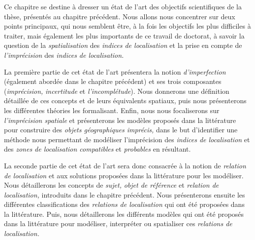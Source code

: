Ce chapitre se destine à dresser un état de l'art des objectifs
scientifiques de la thèse, présentés au chapitre précédent. Nous
allons nous concentrer sur deux points principaux, qui nous semblent
être, à la fois les objectifs les plus difficiles à traiter, mais
également les plus importants de ce travail de doctorat, à savoir la
question de la \emph{spatialisation} des \emph{indices de
  localisation} et la prise en compte de \emph{l'imprécision} des
\emph{indices de localisation.}

La première partie de cet état de l'art présentera la notion
\emph{d'imperfection} (également abordée dans le chapitre précédent)
et ses trois composantes (\emph{imprécision,} \emph{incertitude} et
\emph{l'incomplétude}). Nous donnerons une définition détaillée de ces
concepts et de leurs équivalents spatiaux, puis nous présenterons les
différentes théories les formalisant. Enfin, nous nous focaliserons
sur \emph{l'imprécision spatiale} et présenterons les modèles proposés
dans la littérature pour construire des \emph{objets géographiques
  imprécis,} dans le but d'identifier une méthode nous permettant de
modéliser l'imprécision des \emph{indices de localisation} et des
\emph{zones de localisation compatibles} et \emph{probables} en
résultant.

La seconde partie de cet état de l'art sera donc consacrée à la notion
de \emph{relation de localisation} et aux solutions proposées dans la
littérature pour les modéliser. Nous détaillerons les concepts de
\emph{sujet,} \emph{objet de référence} et \emph{relation de
  localisation,} introduits dans le chapitre précédent. Nous
présenterons ensuite les différentes classifications des
\emph{relations de localisation} qui ont été proposées dans la
littérature. Puis, nous détaillerons les différents modèles qui ont
été proposés dans la littérature pour modéliser, interpréter ou
spatialiser ces \emph{relations de localisation.}

